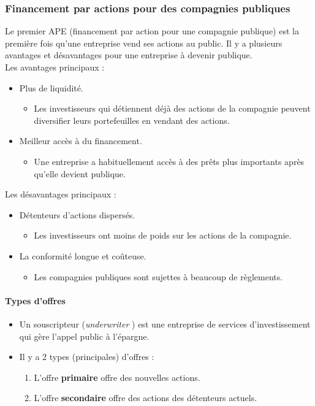 \documentclass[10pt, french]{article}
\begin{document}
\begin{multicols*}{2}
\columnbreak
\subsubsection{Financement par actions pour des compagnies publiques}
Le premier APE (financement par action pour une compagnie publique) est la première fois qu'une entreprise vend ses actions au public. Il y a plusieurs avantages et désavantages pour une entreprise à devenir publique.\\

Les avantages principaux : 
\begin{itemize}
	\item	Plus de liquidité.
		\begin{itemize}
		\item	Les investisseurs qui détiennent déjà des actions de la compagnie peuvent diversifier leurs portefeuilles en vendant des actions.
		\end{itemize}
	\item	Meilleur accès à du financement.
		\begin{itemize}
		\item	Une entreprise a habituellement accès à des prêts plus importants après qu'elle devient publique.
		\end{itemize}
\end{itemize}

Les désavantages principaux :
\begin{itemize}
	\item	Détenteurs d'actions dispersés.
		\begin{itemize}
		\item	Les investisseurs ont moins de poids sur les actions de la compagnie.
		\end{itemize}
	\item	La conformité longue et coûteuse.
		\begin{itemize}
		\item	Les compagnies publiques sont sujettes à beaucoup de règlements.
		\end{itemize}
\end{itemize}


\paragraph{Types d'offres}
\begin{itemize}
	\item	Un souscripteur (\og \textit{underwriter} \fg{}) est une entreprise de services d'investissement qui gère l'appel public à l'épargne.
	\item	Il y a 2 types (principales) d'offres : 
		\begin{enumerate}
		\item	L'offre \textbf{primaire} offre des nouvelles actions.
		\item	L'offre \textbf{secondaire} offre des actions des détenteurs actuels.
		\end{enumerate}
\end{itemize}


\end{multicols*}
\end{document}
